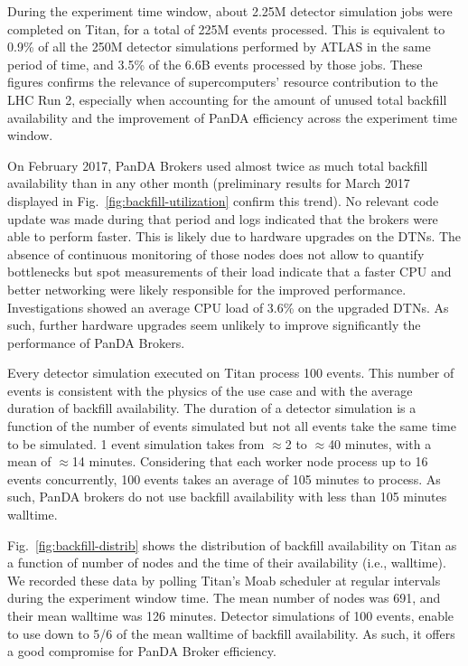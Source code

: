 \documentclass[conference]{IEEEtran}
\begin{document}
During the experiment time window, about 2.25M detector simulation jobs were
completed on Titan, for a total of 225M events processed. This is equivalent to
0.9\% of all the 250M detector simulations performed by ATLAS in the same period
of time, and 3.5\% of the 6.6B events processed by those jobs. These figures
confirms the relevance of supercomputers' resource contribution to the LHC Run
2, especially when accounting for the amount of unused total backfill
availability and the improvement of PanDA efficiency across the experiment time
window.

On February 2017, PanDA Brokers used almost twice as much total backfill
availability than in any other month (preliminary results for March 2017
displayed in Fig.~\ref{fig:backfill-utilization} confirm this trend). No
relevant code update was made during that period and logs indicated that the
brokers were able to perform faster. This is likely due to hardware upgrades on
the DTNs. The absence of continuous monitoring of those nodes does not allow to
quantify bottlenecks but spot measurements of their load indicate that a faster
CPU and better networking were likely responsible for the improved performance.
Investigations showed an average CPU load of 3.6\% on the upgraded DTNs. As
such, further hardware upgrades seem unlikely to improve significantly the
performance of PanDA Brokers.

Every detector simulation executed on Titan process 100 events. This number of
events is consistent with the physics of the use case and with the average
duration of backfill availability. The duration of a detector simulation is a
function of the number of events simulated but not all events take the same time
to be simulated. 1 event simulation takes from $\approx$2 to $\approx$40
minutes, with a mean of $\approx$14 minutes. Considering that each worker node
process up to 16 events concurrently, 100 events takes an average of 105 minutes
to process. As such, PanDA brokers do not use backfill availability with less
than 105 minutes walltime.

Fig.~\ref{fig:backfill-distrib} shows the distribution of backfill availability
on Titan as a function of number of nodes and the time of their availability
(i.e., walltime). We recorded these data by polling Titan's Moab scheduler at
regular intervals during the experiment window time. The mean number of nodes
was 691, and their mean walltime was 126 minutes. Detector simulations of 100
events, enable to use down to 5/6 of the mean walltime of backfill availability.
As such, it offers a good compromise for PanDA Broker efficiency.
\end{document}
